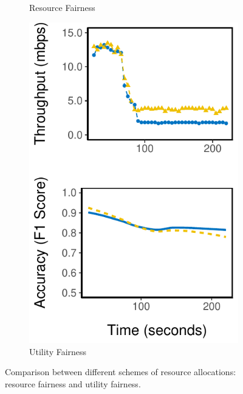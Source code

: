 \begin{figure}
\begin{subfigure}[t]{0.49\columnwidth}
    \caption{Resource Fairness}
    \label{fig:eq-bw}
  \end{subfigure}
  \hfill
  \begin{subfigure}[t]{0.49\columnwidth}
    \centering
    \includegraphics[width=\textwidth]{figures/multitask-eq-acc.pdf}
    \caption{Utility Fairness}
    \label{fig:eq-acc}
  \end{subfigure}
  \caption{Comparison between different schemes of resource allocations:
    resource fairness and utility fairness.}
  \label{fig:multitask}
\end{figure}

